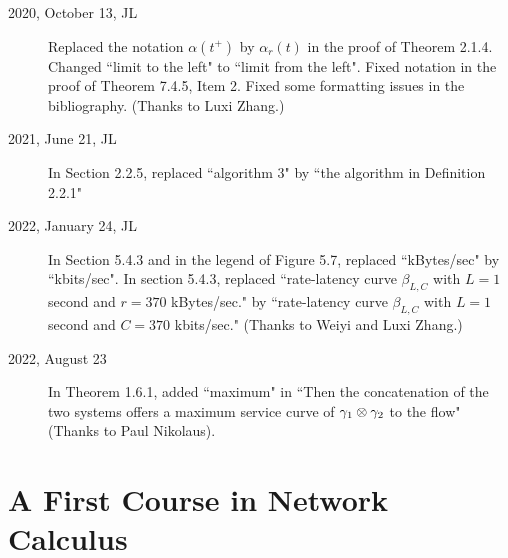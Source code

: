 \documentclass[11pt,twoside,onecolumn,a4paper]{book}
\begin{document}
\begin{description}
        \item[2020, October 13, JL] Replaced the notation $\alpha(t^+)$ by $\alpha_r(t)$ in the proof of Theorem 2.1.4. Changed ``limit to the left" to ``limit from the left". Fixed notation in the proof of Theorem 7.4.5, Item 2. Fixed some formatting issues in the bibliography. (Thanks to Luxi Zhang.)
        \item[2021, June 21, JL] In Section 2.2.5, replaced ``algorithm 3" by ``the algorithm in Definition 2.2.1"
\item[2022, January 24, JL] In Section 5.4.3 and in the legend of Figure 5.7, replaced ``kBytes/sec" by ``kbits/sec". In section 5.4.3, replaced ``rate-latency curve $\beta_{L,C}$ with $L = 1$ second and $r = 370$ kBytes/sec." by ``rate-latency curve $\beta_{L,C}$ with $L = 1$ second and $C = 370$ kbits/sec." (Thanks to Weiyi and Luxi Zhang.)

\item[2022, August 23] In Theorem 1.6.1, added ``maximum" in ``Then the concatenation of the two systems offers a maximum service
curve of $\gamma_{1} \otimes \gamma_{2}$ to the flow" (Thanks to Paul Nikolaus).

\end{description}






\tableofcontents








 \mainmatter
\part{A First Course in Network Calculus}
\newpage
\thispagestyle{plain}
\end{document}
